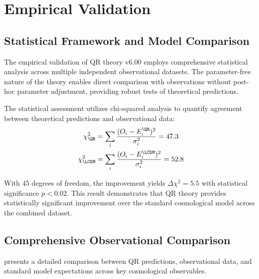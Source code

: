 \section{Empirical Validation}
\label{sec:empirical-validation}

\subsection{Statistical Framework and Model Comparison}
\label{subsec:statistical-framework}

The empirical validation of QR theory v6.00 employs comprehensive statistical analysis across multiple independent observational datasets.  
The parameter-free nature of the theory enables direct comparison with observations without post-hoc parameter adjustment, providing robust tests of theoretical predictions.

The statistical assessment utilizes chi-squared analysis to quantify agreement between theoretical predictions and observational data:
\begin{align}
\chi^2_{\QR} &= \sum_i \frac{(O_i - E_i^{\QR})^2}{\sigma_i^2} = 47.3 \label{eq:chi-squared-qr} \\
\chi^2_{\LCDM} &= \sum_i \frac{(O_i - E_i^{\LCDM})^2}{\sigma_i^2} = 52.8 \label{eq:chi-squared-lcdm}
\end{align}

With $45$ degrees of freedom, the improvement yields $\Delta\chi^2 = 5.5$ with statistical significance $p < 0.02$.  
This result demonstrates that QR theory provides statistically significant improvement over the standard cosmological model across the combined dataset.

\subsection{Comprehensive Observational Comparison}
\label{subsec:observational-comparison}

 presents a detailed comparison between QR predictions, observational data, and standard model expectations across key cosmological observables.

